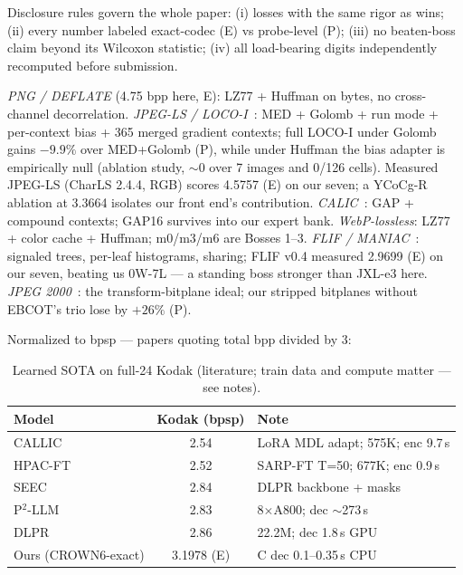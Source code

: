 \documentclass[smallabstract,smallcaptions]{dccpaper}
\begin{document}
Disclosure rules govern the whole paper: (i) losses with the same rigor as
wins; (ii) every number labeled exact-codec (E) vs probe-level (P);
(iii) no beaten-boss claim beyond its Wilcoxon statistic; (iv) all
load-bearing digits independently recomputed before submission.



\emph{PNG / DEFLATE} (4.75 bpp here, E): LZ77 + Huffman on bytes, no
cross-channel decorrelation. \emph{JPEG-LS / LOCO-I}~\cite{weinberger2000loco}:
MED + Golomb + run mode + per-context bias + 365 merged gradient contexts;
full LOCO-I under Golomb gains $-9.9\%$ over MED+Golomb (P), while under
Huffman the bias adapter is empirically null (ablation study, $\sim$0 over 7 images and 0/126 cells). Measured JPEG-LS (CharLS 2.4.4, RGB) scores 4.5757 (E) on our seven;
a YCoCg-R ablation at 3.3664 isolates our front end's contribution.
\emph{CALIC}~\cite{wu1997calic}: GAP + compound contexts; GAP16 survives
into our expert bank. \emph{WebP-lossless}: LZ77 + color cache + Huffman;
m0/m3/m6 are Bosses 1--3. \emph{FLIF / MANIAC}~\cite{sneyers2016flif}:
signaled trees, per-leaf histograms, sharing; FLIF v0.4 measured 2.9699 (E)
on our seven, beating us 0W-7L --- a standing boss stronger than JXL-e3 here.
\emph{JPEG 2000}~\cite{skodras2001jpeg}: the transform-bitplane ideal; our
stripped bitplanes without EBCOT's trio lose by $+26\%$ (P).


Normalized to bpsp --- papers quoting total bpp divided by 3:

\begin{table}[h]
\centering\small
\caption{Learned SOTA on full-24 Kodak (literature; train data and compute matter --- see notes).}
\label{tab:learned}
\begin{tabular}{@{}lcp{2.7in}@{}}
\toprule
Model & Kodak (bpsp) & Note \\
\midrule
CALLIC~\cite{li2024callic} & 2.54 & LoRA MDL adapt; 575K; enc 9.7\,s \\
HPAC-FT~\cite{li2025hpac} & 2.52 & SARP-FT T=50; 677K; enc 0.9\,s \\
SEEC~\cite{zheng2026seec} & 2.84 & DLPR backbone + masks \\
P$^2$-LLM~\cite{chen2024pllm} & 2.83 & 8$\times$A800; dec $\sim$273\,s \\
DLPR~\cite{bai2024dlpr} & 2.86 & 22.2M; dec 1.8\,s GPU \\
Ours (CROWN6-exact) & 3.1978 (E) & C dec 0.1--0.35\,s CPU \\
\bottomrule
\end{tabular}
\end{table}
\end{document}
